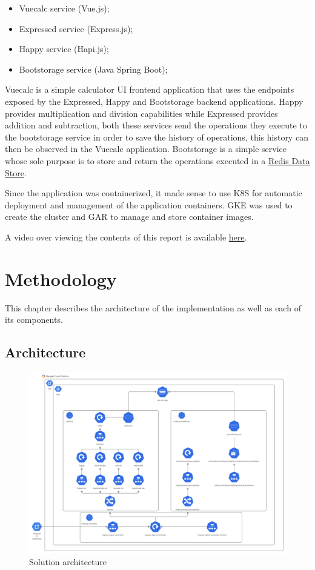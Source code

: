 \documentclass[12pt,a4paper,oneside]{report}
\begin{document}
\begin{itemize}
  \item Vuecalc service (Vue.js);
  \item Expressed service (Express.js);
  \item Happy service (Hapi.js);
  \item Bootstorage service (Java Spring Boot);
\end{itemize}

Vuecalc is a simple calculator UI frontend application that uses the endpoints exposed by the Expressed, Happy and Bootstorage backend applications. Happy provides multiplication and division capabilities while Expressed provides addition and subtraction, both these services send the operations they execute to the bootstorage service in order to save the history of operations, this history can then be observed in the Vuecalc application.
Bootstorage is a simple service whose sole purpose is to store and return the operations executed in a \href{https://redis.io/}{Redis Data Store}.

Since the application was containerized, it made sense to use \ac{K8S} for automatic deployment and management of the application containers. \ac{GKE} was used to create the cluster and \ac{GAR} to manage and store container images.

A video over viewing the contents of this report is available \href{https://youtu.be/PeXhR1QCIVk}{here}.
\cleardoublepage

\cleardoublepage
\chapter{Methodology}
This chapter describes the architecture of the implementation as well as each of its components.
\section{Architecture}

\begin{figure}[htb]
\centering
\includegraphics[width=1.0\textwidth]{./pictures/arch.png}
\caption{Solution architecture}
\label{fig:network}
\end{figure}
\end{document}
